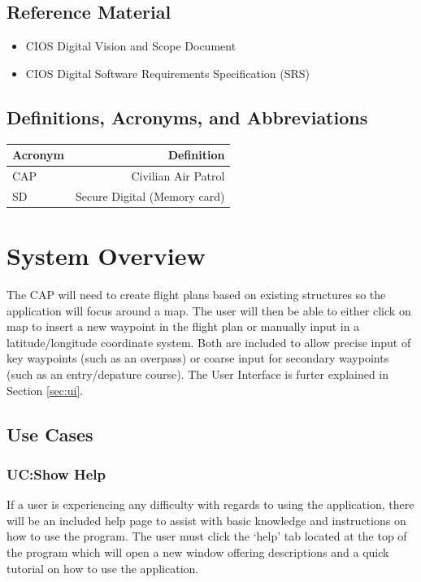 \documentclass[12pt, letterpaper]{article}
\begin{document}
  \subsection{Reference Material}
    \begin{itemize}
      \setlength{\itemsep}{1pt}
      \setlength{\parskip}{0pt}
      \setlength{\parsep}{0pt}
      \item CIOS Digital Vision and Scope Document
      \item CIOS Digital Software Requirements Specification (SRS)
    \end{itemize}

\subsection{Definitions, Acronyms, and Abbreviations}
\begin{tabularx}{\textwidth}{|l|R|} \hline
  Acronym & Definition \\ \hline
  CAP & Civilian Air Patrol  \\ \hline
  SD & Secure Digital (Memory card) \\ \hline
\end{tabularx}

\newpage
\section{System Overview}\label{system}
The CAP will need to create flight plans based on existing structures so the application will focus around a map.
The user will then be able to either click on map to insert a new waypoint in the flight plan or manually input in a latitude/longitude coordinate system.
Both are included to allow precise input of key waypoints (such as an overpass) or coarse input for secondary waypoints (such as an entry/depature course).
The User Interface is furter explained in Section \ref{sec:ui}.

\subsection{Use Cases}
\subsubsection{UC:Show Help}
If a user is experiencing any difficulty with regards to using the application, there will be an included help page to assist with basic knowledge and instructions on how to use the program.
The user must click the `help' tab located at the top of the program which will open a new window offering descriptions and a quick tutorial on how to use the application.
\end{document}
